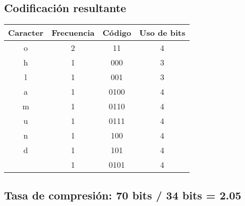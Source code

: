 \documentclass{article}
\begin{document}
\begin{center}
		
		\subsection*{Codificación resultante}
		\begin{tabular}{c|c|c|c}
			\textbf{Caracter} & \textbf{Frecuencia} & \textbf{Código} & \textbf{Uso de bits}\\
			\hline
			o & 2 & 11    & 4\\
			h & 1 & 000   & 3\\
			l & 1 & 001   & 3\\
			a & 1 & 0100  & 4\\
			m & 1 & 0110  & 4\\
			u & 1 & 0111  & 4\\
			n & 1 & 100   & 4\\
			d & 1 & 101   & 4\\
			  & 1 & 0101  & 4\\
		\end{tabular}
		\subsection*{Tasa de compresión: 70 bits / 34 bits = 2.05}	
	\end{center}
	
\end{document}
